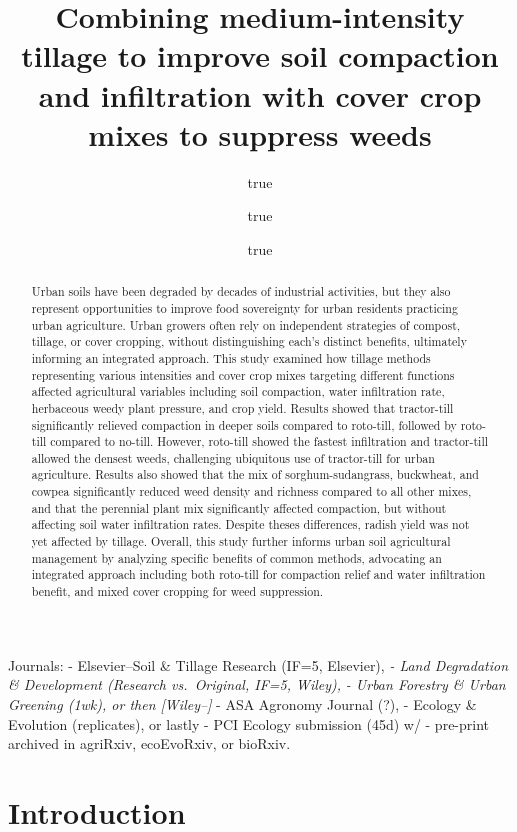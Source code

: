 \documentclass[
]{article}
\title{Combining medium-intensity tillage to improve soil compaction and infiltration with cover crop mixes to suppress weeds}
\author{true \and true \and true}
\date{}
\begin{document}
\maketitle
\begin{abstract}
Urban soils have been degraded by decades of industrial activities, but they also represent opportunities to improve food sovereignty for urban residents practicing urban agriculture.
Urban growers often rely on independent strategies of compost, tillage, or cover cropping, without distinguishing each's distinct benefits, ultimately informing an integrated approach.
This study examined how tillage methods representing various intensities and cover crop mixes targeting different functions affected agricultural variables including soil compaction, water infiltration rate, herbaceous weedy plant pressure, and crop yield.
Results showed that tractor-till significantly relieved compaction in deeper soils compared to roto-till, followed by roto-till compared to no-till.
However, roto-till showed the fastest infiltration and tractor-till allowed the densest weeds, challenging ubiquitous use of tractor-till for urban agriculture.
Results also showed that the mix of sorghum-sudangrass, buckwheat, and cowpea significantly reduced weed density and richness compared to all other mixes, and that the perennial plant mix significantly affected compaction, but without affecting soil water infiltration rates.
Despite theses differences, radish yield was not yet affected by tillage.
Overall, this study further informs urban soil agricultural management by analyzing specific benefits of common methods, advocating an integrated approach including both roto-till for compaction relief and water infiltration benefit, and mixed cover cropping for weed suppression.
\end{abstract}

{
\setcounter{tocdepth}{2}
\tableofcontents
}
Journals:
- Elsevier--Soil \& Tillage Research (IF=5, Elsevier),
\emph{- Land Degradation \& Development (Research vs.~Original, IF=5, Wiley), }
\emph{- Urban Forestry \& Urban Greening (1wk), or then {[}Wiley--{]}}
- ASA Agronomy Journal (?),
- Ecology \& Evolution (replicates), or lastly
- PCI Ecology submission (45d) w/
- pre-print archived in agriRxiv, ecoEvoRxiv, or bioRxiv.

\hypertarget{introduction}{%
\section{Introduction}\label{introduction}}
\end{document}
